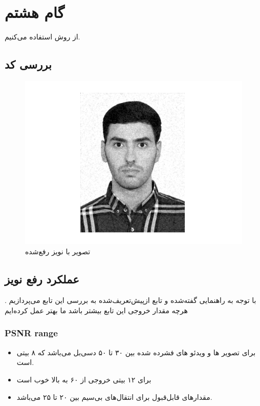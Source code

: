 \section{گام هشتم}
از روش 
استفاده می‌کنیم.
\subsection{بررسی کد}
\lr{}

\begin{figure}[H]
    \centering
    \includegraphics[width=0.65\linewidth]{images/removednoise.png}
    \caption{ تصویر با نویز رفع‌شده }
    \label{fig:h}
\end{figure}

\subsection{عملکرد رفع نویز }
با توجه به راهنمایی گفته‌شده و تابع ازپیش‌تعریف‌شده 
به بررسی این تابع می‌پردازیم
.
هرچه مقدار خروجی این تابع بیشتر باشد ما بهتر عمل کرده‌ایم
\subsubsection{PSNR range}
\begin{itemize}
    \item برای تصویر ها و ویدئو های فشرده شده بین 
    ۳۰ تا ۵۰ دسی‌بل می‌باشد
    که ۸ بیتی است.
    \item برای ۱۲ بیتی خروجی از ۶۰ به بالا خوب است
    \item مقدارهای قابل‌قبول برای انتقال‌های بی‌سیم بین ۲۰ تا ۲۵ می‌باشد.
\end{itemize}
\lr{}
